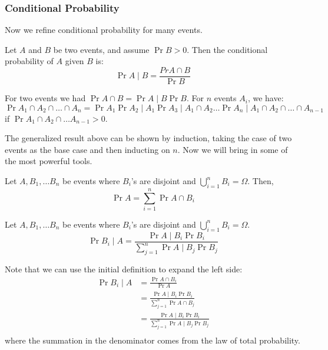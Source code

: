 \subsubsection{Conditional Probability}
Now we refine conditional probability for many events.

\begin{definition} 
    Let $A$ and $B$ be two events, and assume $\Pr{B} > 0$. Then the conditional probability of $A$ given $B$ is:
    \[ \Pr{A \mid B} = \frac{Pr{A \cap B}}{\Pr{B}} \]
\end{definition}

\begin{theorem} 
    For two events we had $\Pr{A \cap B} = \Pr{A \mid B} \Pr{B}$. For $n$ events
    $A_i$, we have:
    \[ \Pr{A_1 \cap A_2 \cap \dots \cap A_n} = \Pr{A_1} \Pr{A_2 \mid A_1} \Pr{A_3 \mid A_1 \cap A_2} \dots \Pr{A_n \mid A_1 \cap A_2 \cap \dots \cap A_{n -1}} \]
    if $\Pr{A_1 \cap A_2 \cap \dots A_{n - 1}} > 0$.
\end{theorem}

The generalized result above can be shown by induction, taking the case of two events as the base case and then inducting on $n$.
Now we will bring in some of the most powerful tools.

\begin{theorem}
    Let $A, B_1, \dots B_n$ be events where $B_i$'s are disjoint and $\bigcup_{i=1}^n B_i = \Omega$.
    Then,
    \[ \Pr{A} = \sum_{i = 1}^n \Pr{A \cap B_i} \]
\end{theorem}

\begin{theorem} 
    Let $A, B_1, \dots B_n$ be events where $B_i$'s are disjoint and $\bigcup_{i=1}^n B_i = \Omega$.
    \[ \Pr{B_i \mid A} = \frac{\Pr{A \mid B_i} \Pr{B_i}}{\sum_{j = 1}^n \Pr{A \mid B_j}\Pr{B_j}} \]

    \begin{proof*}
        Note that we can use the initial definition to expand the left side:
        \begin{align*}
            \Pr{B_i \mid A} &= \frac{\Pr{A \cap B_i}}{\Pr{A}} \\
            &= \frac{\Pr{A \mid B_i} \Pr{B_i}}{\sum_{j = 1}^n \Pr{A \cap B_j}} \\
            &= \frac{\Pr{A \mid B_i} \Pr{B_i}}{\sum_{j = 1}^n \Pr{A \mid B_j} \Pr{B_j}} \\
        \end{align*}
        where the summation in the denominator comes from the law of total probability.
    \end{proof*}
\end{theorem}

